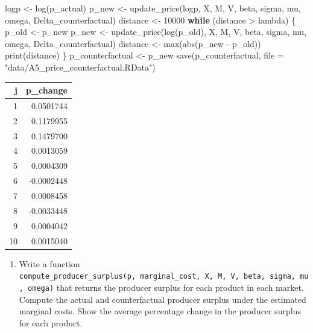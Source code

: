 \documentclass[
]{book}
\newenvironment{Shaded}{\begin{snugshade}}{\end{snugshade}}
\newcommand{\AttributeTok}[1]{\textcolor[rgb]{0.77,0.63,0.00}{#1}}
\newcommand{\ControlFlowTok}[1]{\textcolor[rgb]{0.13,0.29,0.53}{\textbf{#1}}}
\newcommand{\DecValTok}[1]{\textcolor[rgb]{0.00,0.00,0.81}{#1}}
\newcommand{\FunctionTok}[1]{\textcolor[rgb]{0.00,0.00,0.00}{#1}}
\newcommand{\NormalTok}[1]{#1}
\newcommand{\OtherTok}[1]{\textcolor[rgb]{0.56,0.35,0.01}{#1}}
\newcommand{\SpecialCharTok}[1]{\textcolor[rgb]{0.00,0.00,0.00}{#1}}
\newcommand{\StringTok}[1]{\textcolor[rgb]{0.31,0.60,0.02}{#1}}
\providecommand{\tightlist}{%
  \setlength{\itemsep}{0pt}\setlength{\parskip}{0pt}}
\begin{document}
\begin{Shaded}
\begin{Highlighting}[]
\NormalTok{logp }\OtherTok{\textless{}{-}} \FunctionTok{log}\NormalTok{(p\_actual)}
\NormalTok{p\_new }\OtherTok{\textless{}{-}} \FunctionTok{update\_price}\NormalTok{(logp, X, M, V, beta, sigma, mu, omega, Delta\_counterfactual)}
\NormalTok{distance }\OtherTok{\textless{}{-}} \DecValTok{10000}
\ControlFlowTok{while}\NormalTok{ (distance }\SpecialCharTok{\textgreater{}}\NormalTok{ lambda) \{}
\NormalTok{  p\_old }\OtherTok{\textless{}{-}}\NormalTok{ p\_new}
\NormalTok{  p\_new }\OtherTok{\textless{}{-}} \FunctionTok{update\_price}\NormalTok{(}\FunctionTok{log}\NormalTok{(p\_old), X, M, V, beta, sigma, mu, omega, Delta\_counterfactual)}
\NormalTok{  distance }\OtherTok{\textless{}{-}} \FunctionTok{max}\NormalTok{(}\FunctionTok{abs}\NormalTok{(p\_new }\SpecialCharTok{{-}}\NormalTok{ p\_old))}
  \FunctionTok{print}\NormalTok{(distance)}
\NormalTok{\}}
\NormalTok{p\_counterfactual }\OtherTok{\textless{}{-}}\NormalTok{ p\_new}
\FunctionTok{save}\NormalTok{(p\_counterfactual, }\AttributeTok{file =} \StringTok{"data/A5\_price\_counterfactual.RData"}\NormalTok{)}
\end{Highlighting}
\end{Shaded}

\begin{tabular}{r|r}
\hline
j & p\_change\\
\hline
1 & 0.0501744\\
\hline
2 & 0.1179955\\
\hline
3 & 0.1479700\\
\hline
4 & 0.0013059\\
\hline
5 & 0.0004309\\
\hline
6 & -0.0002448\\
\hline
7 & 0.0008458\\
\hline
8 & -0.0033448\\
\hline
9 & 0.0004042\\
\hline
10 & 0.0015040\\
\hline
\end{tabular}

\begin{enumerate}
\def\labelenumi{\arabic{enumi}.}
\setcounter{enumi}{2}
\tightlist
\item
  Write a function \texttt{compute\_producer\_surplus(p,\ marginal\_cost,\ X,\ M,\ V,\ beta,\ sigma,\ mu,\ omega)} that returns the producer surplus for each product in each market. Compute the actual and counterfactual producer surplus under the estimated marginal costs. Show the average percentage change in the producer surplus for each product.
\end{enumerate}
\end{document}
